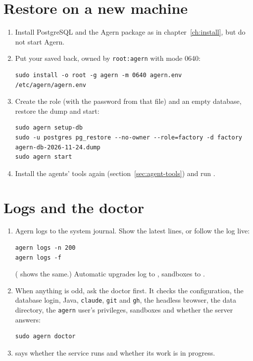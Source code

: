 \section{Restore on a new machine}\label{sec:restore}

\begin{enumerate}
  \item Install PostgreSQL and the Agern package as in chapter~\ref{ch:install}, but do not start Agern.
  \item Put your saved  back, owned by \texttt{root:agern} with mode 0640:
\begin{lstlisting}
sudo install -o root -g agern -m 0640 agern.env /etc/agern/agern.env
\end{lstlisting}
  \item Create the role (with the password from that file) and an empty database, restore the dump
    and start:
\begin{lstlisting}
sudo agern setup-db
sudo -u postgres pg_restore --no-owner --role=factory -d factory agern-db-2026-11-24.dump
sudo agern start
\end{lstlisting}
  \item Install the agents' tools again (section~\ref{sec:agent-tools}) and run .
\end{enumerate}

\section{Logs and the doctor}\label{sec:logs}

\begin{enumerate}
  \item Agern logs to the system journal. Show the latest lines, or follow the log live:
\begin{lstlisting}
agern logs -n 200
agern logs -f
\end{lstlisting}
    ( shows the same.) Automatic upgrades log to
    , sandboxes to .
  \item When anything is odd, ask the doctor first. It checks the configuration, the database login,
    Java, \texttt{claude}, \texttt{git} and \texttt{gh}, the headless browser, the data directory,
    the \texttt{agern} user's privileges, sandboxes and whether the server answers:
\begin{lstlisting}
sudo agern doctor
\end{lstlisting}
  \item {} says whether the service runs and whether its work is in progress.
\end{enumerate}

